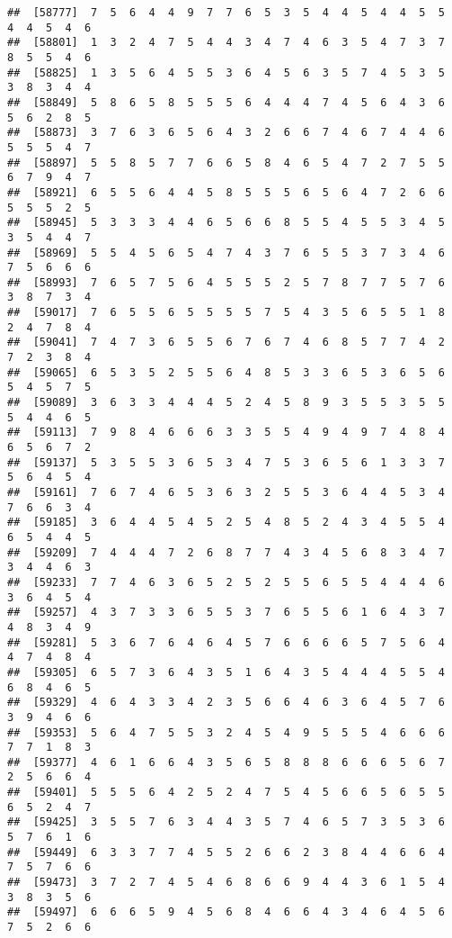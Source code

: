\documentclass[
]{book}
\begin{document}
\begin{verbatim}
##  [58777]  7  5  6  4  4  9  7  7  6  5  3  5  4  4  5  4  4  5  5  4  4  5  4  6
##  [58801]  1  3  2  4  7  5  4  4  3  4  7  4  6  3  5  4  7  3  7  8  5  5  4  6
##  [58825]  1  3  5  6  4  5  5  3  6  4  5  6  3  5  7  4  5  3  5  3  8  3  4  4
##  [58849]  5  8  6  5  8  5  5  5  6  4  4  4  7  4  5  6  4  3  6  5  6  2  8  5
##  [58873]  3  7  6  3  6  5  6  4  3  2  6  6  7  4  6  7  4  4  6  5  5  5  4  7
##  [58897]  5  5  8  5  7  7  6  6  5  8  4  6  5  4  7  2  7  5  5  6  7  9  4  7
##  [58921]  6  5  5  6  4  4  5  8  5  5  5  6  5  6  4  7  2  6  6  5  5  5  2  5
##  [58945]  5  3  3  3  4  4  6  5  6  6  8  5  5  4  5  5  3  4  5  3  5  4  4  7
##  [58969]  5  5  4  5  6  5  4  7  4  3  7  6  5  5  3  7  3  4  6  7  5  6  6  6
##  [58993]  7  6  5  7  5  6  4  5  5  5  2  5  7  8  7  7  5  7  6  3  8  7  3  4
##  [59017]  7  6  5  5  6  5  5  5  5  7  5  4  3  5  6  5  5  1  8  2  4  7  8  4
##  [59041]  7  4  7  3  6  5  5  6  7  6  7  4  6  8  5  7  7  4  2  7  2  3  8  4
##  [59065]  6  5  3  5  2  5  5  6  4  8  5  3  3  6  5  3  6  5  6  5  4  5  7  5
##  [59089]  3  6  3  3  4  4  4  5  2  4  5  8  9  3  5  5  3  5  5  5  4  4  6  5
##  [59113]  7  9  8  4  6  6  6  3  3  5  5  4  9  4  9  7  4  8  4  6  5  6  7  2
##  [59137]  5  3  5  5  3  6  5  3  4  7  5  3  6  5  6  1  3  3  7  5  6  4  5  4
##  [59161]  7  6  7  4  6  5  3  6  3  2  5  5  3  6  4  4  5  3  4  7  6  6  3  4
##  [59185]  3  6  4  4  5  4  5  2  5  4  8  5  2  4  3  4  5  5  4  6  5  4  4  5
##  [59209]  7  4  4  4  7  2  6  8  7  7  4  3  4  5  6  8  3  4  7  3  4  4  6  3
##  [59233]  7  7  4  6  3  6  5  2  5  2  5  5  6  5  5  4  4  4  6  3  6  4  5  4
##  [59257]  4  3  7  3  3  6  5  5  3  7  6  5  5  6  1  6  4  3  7  4  8  3  4  9
##  [59281]  5  3  6  7  6  4  6  4  5  7  6  6  6  6  5  7  5  6  4  4  7  4  8  4
##  [59305]  6  5  7  3  6  4  3  5  1  6  4  3  5  4  4  4  5  5  4  6  8  4  6  5
##  [59329]  4  6  4  3  3  4  2  3  5  6  6  4  6  3  6  4  5  7  6  3  9  4  6  6
##  [59353]  5  6  4  7  5  5  3  2  4  5  4  9  5  5  5  4  6  6  6  7  7  1  8  3
##  [59377]  4  6  1  6  6  4  3  5  6  5  8  8  8  6  6  6  5  6  7  2  5  6  6  4
##  [59401]  5  5  5  6  4  2  5  2  4  7  5  4  5  6  6  5  6  5  5  6  5  2  4  7
##  [59425]  3  5  5  7  6  3  4  4  3  5  7  4  6  5  7  3  5  3  6  5  7  6  1  6
##  [59449]  6  3  3  7  7  4  5  5  2  6  6  2  3  8  4  4  6  6  4  7  5  7  6  6
##  [59473]  3  7  2  7  4  5  4  6  8  6  6  9  4  4  3  6  1  5  4  3  8  3  5  6
##  [59497]  6  6  6  5  9  4  5  6  8  4  6  6  4  3  4  6  4  5  6  7  5  2  6  6

\end{verbatim}
\end{document}
